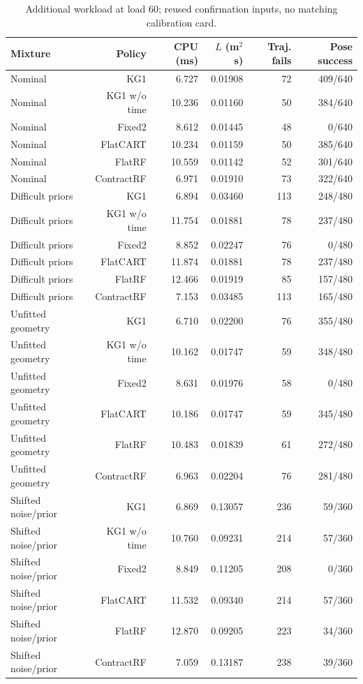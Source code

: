 \begin{table}[!htbp]\centering\scriptsize
\caption{Additional workload at load 60; reused confirmation inputs, no matching calibration card.}\label{supp:stress60}
\begin{tabular}{@{}lrrrrr@{}}\toprule
Mixture & Policy & CPU (ms) & $L$ (m$^2$s) & Traj. fails & Pose success\\\midrule
Nominal & KG1 & 6.727 & 0.01908 & 72 & 409/640\\
Nominal & KG1 w/o time & 10.236 & 0.01160 & 50 & 384/640\\
Nominal & Fixed2 & 8.612 & 0.01445 & 48 & 0/640\\
Nominal & FlatCART & 10.234 & 0.01159 & 50 & 385/640\\
Nominal & FlatRF & 10.559 & 0.01142 & 52 & 301/640\\
Nominal & ContractRF & 6.971 & 0.01910 & 73 & 322/640\\
Difficult priors & KG1 & 6.894 & 0.03460 & 113 & 248/480\\
Difficult priors & KG1 w/o time & 11.754 & 0.01881 & 78 & 237/480\\
Difficult priors & Fixed2 & 8.852 & 0.02247 & 76 & 0/480\\
Difficult priors & FlatCART & 11.874 & 0.01881 & 78 & 237/480\\
Difficult priors & FlatRF & 12.466 & 0.01919 & 85 & 157/480\\
Difficult priors & ContractRF & 7.153 & 0.03485 & 113 & 165/480\\
Unfitted geometry & KG1 & 6.710 & 0.02200 & 76 & 355/480\\
Unfitted geometry & KG1 w/o time & 10.162 & 0.01747 & 59 & 348/480\\
Unfitted geometry & Fixed2 & 8.631 & 0.01976 & 58 & 0/480\\
Unfitted geometry & FlatCART & 10.186 & 0.01747 & 59 & 345/480\\
Unfitted geometry & FlatRF & 10.483 & 0.01839 & 61 & 272/480\\
Unfitted geometry & ContractRF & 6.963 & 0.02204 & 76 & 281/480\\
Shifted noise/prior & KG1 & 6.869 & 0.13057 & 236 & 59/360\\
Shifted noise/prior & KG1 w/o time & 10.760 & 0.09231 & 214 & 57/360\\
Shifted noise/prior & Fixed2 & 8.849 & 0.11205 & 208 & 0/360\\
Shifted noise/prior & FlatCART & 11.532 & 0.09340 & 214 & 57/360\\
Shifted noise/prior & FlatRF & 12.870 & 0.09205 & 223 & 34/360\\
Shifted noise/prior & ContractRF & 7.059 & 0.13187 & 238 & 39/360\\
\bottomrule\end{tabular}\end{table}

